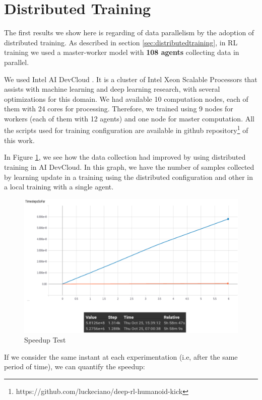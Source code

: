 \section{Distributed Training}

The first results we show here is regarding of data parallelism by the adoption of distributed training. As described in section \ref{sec:distributedtraining}, in RL training we used a master-worker model with \textbf{108 agents} collecting data in parallel.

We used Intel AI DevCloud \cite{inteldevcloud}. It is a cluster of Intel Xeon Scalable Processors that assists with machine learning and deep learning research, with several optimizations for this domain. We had available 10 computation nodes, each of them with 24 cores for processing. Therefore, we trained using 9 nodes for workers (each of them with 12 agents) and one node for master computation. All the scripts used for training configuration are available in github repository\footnote{\label{scripts} https://github.com/luckeciano/deep-rl-humanoid-kick} of this work. 

In Figure \ref{fig:speeduptest}, we see how the data collection had improved by using distributed training in AI DevCloud. In this graph, we have the number of samples collected by learning update in a training using the distributed configuration and other in a local training with a single agent. 

\begin{figure}[!htbp]
	\centering
	\includegraphics[width=1\textwidth]{Cap6/speeduptest}
	\caption{Speedup Test}
	\label{fig:speeduptest}
\end{figure}

If we consider the same instant at each experimentation (i.e, after the same period of time), we can quantify the speedup:

